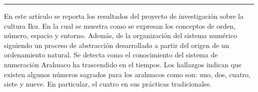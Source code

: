 \begin{titlepage}
\begin{minipage}{0.5\linewidth}
\begin{minipage}{0.45\linewidth}
    \begin{flushright}
        \printauthor
    \end{flushright}
\end{minipage} \hspace{-3pt}
%
\begin{minipage}{0.02\linewidth}
   \color{ptctitle} \rule{1pt}{245pt}
\end{minipage} 
\end{minipage}
\hspace*{-4.5cm}
\begin{minipage}{0.85\linewidth}
\begin{minipage}{0.85\linewidth}
\footnotesize
\vspace{5pt}
    \begin{resumen}
   En este  art\'iculo se reporta los resultados del proyecto de investigaci\'on sobre la cultura Iku. En la cual se muestra como se  expresan los conceptos de orden, n\'umero,  espacio y entorno. Adem\'as,  de la organizaci\'on del sistema num\'erico siguiendo un proceso de abstracci\'on desarrollado a partir del origen de un ordenamiento natural. Se detecta como el conocimiento del sistema de numeraci\'on  Arahuaco ha trascendido en el tiempos. Los hallazgos indican que existen algunos n\'umeros sagrados para los arahuacos como son: uno, dos, cuatro, siete y nueve. En particular, el cuatro en sus pr\'acticas tradicionales. 
     \end{resumen}
\end{minipage}
\vspace*{5pt}\\
\footnotesize
%  
    

\end{minipage}
\end{titlepage}
